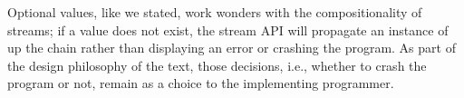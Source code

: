 Optional values, like we stated, work wonders with the compositionality of streams; if a value does not exist, the stream API will propagate an  instance of  up the chain rather than displaying an error or crashing the program. 
As part of the design philosophy of the text, those decisions, i.e., whether to crash the program or not, remain as a choice to the implementing programmer.
